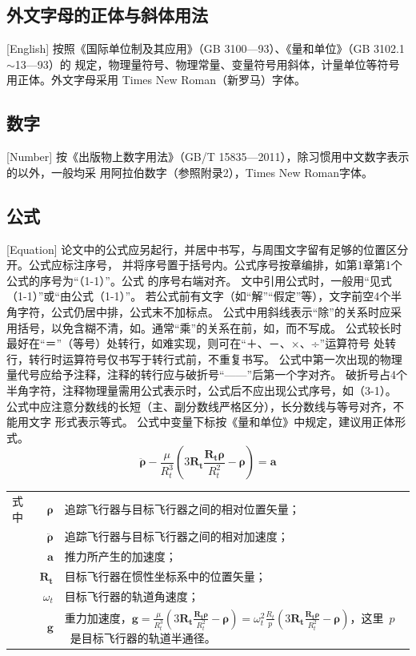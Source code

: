 \subsection{外文字母的正体与斜体用法}[English]
按照《国际单位制及其应用》（GB 3100—93）、《量和单位》（GB 3102.1$\sim$13—93）的
规定，物理量符号、物理常量、变量符号用斜体，计量单位等符号用正体。外文字母采用
Times New Roman（新罗马）字体。

\subsection{数字}[Number]
按《出版物上数字用法》（GB/T 15835—2011），除习惯用中文数字表示的以外，一般均采
用阿拉伯数字（参照附录2），Times New Roman字体。

\subsection{公式}[Equation]
论文中的公式应另起行，并居中书写，与周围文字留有足够的位置区分开。公式应标注序号，
并将序号置于括号内。公式序号按章编排，如第1章第1个公式的序号为“（1-1）”。公式
的序号右端对齐。
文中引用公式时，一般用“见式（1-1）”或“由公式（1-1）”。
若公式前有文字（如“解”“假定”等），文字前空4个半角字符，公式仍居中排，公式末不加标点。
公式中用斜线表示“除”的关系时应采用括号，以免含糊不清，如。通常“乘”的关系在前，如，而不写成。
公式较长时最好在“＝”（等号）处转行，如难实现，则可在“＋、－、×、÷”运算符号
处转行，转行时运算符号仅书写于转行式前，不重复书写。
公式中第一次出现的物理量代号应给予注释，注释的转行应与破折号“——”后第一个字对齐。
破折号占4个半角字符，注释物理量需用公式表示时，公式后不应出现公式序号，如（3-1）。
公式中应注意分数线的长短（主、副分数线严格区分），长分数线与等号对齐，不能用文字
形式表示等式。
公式中变量下标按《量和单位》中规定，建议用正体形式。
\begin{equation}
  \label{eq:2} \ddot{\boldsymbol{\rho}}-\frac{\mu}{R_{t}^{3}}\left(3\mathbf{R_{t}}\frac{\mathbf{R_{t}\rho}}{R_{t}^{2}}-\boldsymbol{\rho}\right)=\mathbf{a}
\end{equation}
\begin{tabularx}{\textwidth}{@{}l@{\quad}r@{———}X@{}}
  式中& $\boldsymbol{\rho}$ &追踪飞行器与目标飞行器之间的相对位置矢量；\\
      &  $\boldsymbol{\ddot{\rho}}$&追踪飞行器与目标飞行器之间的相对加速度；\\
      &  $\mathbf{a}$   &推力所产生的加速度；\\
      &  $\mathbf{R_t}$ & 目标飞行器在惯性坐标系中的位置矢量；\\
      &  $\omega_{t}$ & 目标飞行器的轨道角速度；\\
      &  $\mathbf{g}$ & 重力加速度，$\mathbf{g}=\frac{\mu}{R_{t}^{3}}\left(
                        3\mathbf{R_{t}}\frac{\mathbf{R_{t}\rho}}{R_{t}^{2}}-\boldsymbol{\rho}\right)=\omega_{t}^{2}\frac{R_{t}}{p}\left(
                        3\mathbf{R_{t}}\frac{\mathbf{R_{t}\rho}}{R_{t}^{2}}-\boldsymbol{\rho}\right)$，这里~$p$~是目标飞行器的轨道半通径。
\end{tabularx}\vspace{\ccwd}

